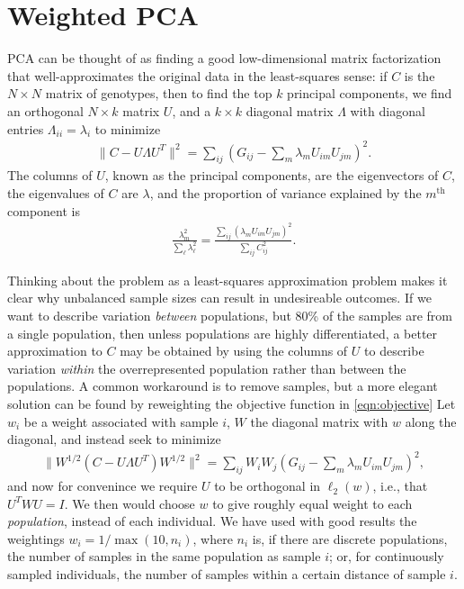 \documentclass[11pt, oneside]{article}   	%
\begin{document}

  

\appendix

\section{Weighted PCA}

PCA can be thought of as finding a good low-dimensional matrix factorization \citep{engelhardt2010analysis}
that well-approximates the original data in the least-squares sense:
if $C$ is the $N \times N$ matrix of genotypes, 
then to find the top $k$ principal components, 
we find an orthogonal $N \times k$ matrix $U$,
and a $k \times k$ diagonal matrix $\Lambda$ with diagonal entries $\Lambda_{ii}=\lambda_i$ to minimize
\begin{align} \label{eqn:objective}
    \| C - U \Lambda U^T \|^2 = \sum_{ij} \left( G_{ij} - \sum_m \lambda_{m} U_{im} U_{jm} \right)^2 .
\end{align}
The columns of $U$, known as the principal components, are the eigenvectors of $C$,
the eigenvalues of $C$ are $\lambda$, and the proportion of variance explained by the $m^\text{th}$ component is
\begin{align*}
    \frac{ \lambda_m^2 }{ \sum_\ell \lambda_\ell^2 } = \frac{ \sum_{ij} ( \lambda_m U_{im} U_{jm} )^2 }{ \sum_{ij} C_{ij}^2 } .
\end{align*}

Thinking about the problem as a least-squares approximation problem
makes it clear why unbalanced sample sizes can result in undesireable outcomes.
If we want to describe variation \emph{between} populations,
but 80\% of the samples are from a single population,
then unless populations are highly differentiated, 
a better approximation to $C$ may be obtained by using the columns of $U$ to describe variation \emph{within} the overrepresented population
rather than between the populations.
A common workaround is to remove samples,
but a more elegant solution can be found by reweighting the objective function in \eqref{eqn:objective}
Let $w_{i}$ be a weight associated with sample $i$,
$W$ the diagonal matrix with $w$ along the diagonal,
and instead seek to minimize
\begin{align} \label{eqn:weighted_objective}
    \| W^{1/2} (C - U \Lambda U^T) W^{1/2} \|^2 = \sum_{ij} W_i W_j \left( G_{ij} - \sum_m \lambda_{m} U_{im} U_{jm} \right)^2 ,
\end{align}
and now for convenince we require $U$ to be orthogonal in $\ell_2(w)$, i.e., that $U^T W U =I$.
We then would choose $w$ to give roughly equal weight to each \emph{population},
instead of each individual.
We have used with good results the weightings
$w_i = 1/\max(10,n_i)$,
where $n_i$ is, if there are discrete populations,
the number of samples in the same population as sample $i$;
or, for continuously sampled individuals,
the number of samples within a certain distance of sample $i$.
\end{document}
